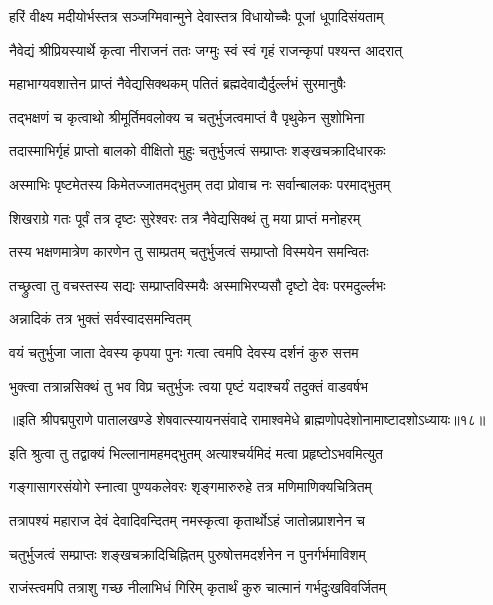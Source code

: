 \twolineshloka
{हरिं वीक्ष्य मदीयोर्भस्तत्र सञ्जग्मिवान्मुने}
{देवास्तत्र विधायोच्चैः पूजां धूपादिसंयताम्}%

\twolineshloka
{नैवेद्यं श्रीप्रियस्यार्थे कृत्वा नीराजनं ततः}
{जग्मुः स्वं स्वं गृहं राजन्कृपां पश्यन्त आदरात्}%

\twolineshloka
{महाभाग्यवशात्तेन प्राप्तं नैवेद्यसिक्थकम्}
{पतितं ब्रह्मदेवाद्यैर्दुर्ल्लभं सुरमानुषैः}%

\twolineshloka
{तद्भक्षणं च कृत्वाथो श्रीमूर्तिमवलोक्य च}
{चतुर्भुजत्वमाप्तं वै पृथुकेन सुशोभिना}%

\twolineshloka
{तदास्माभिर्गृहं प्राप्तो बालको वीक्षितो मुहुः}
{चतुर्भुजत्वं सम्प्राप्तः शङ्खचक्रादिधारकः}%

\twolineshloka
{अस्माभिः पृष्टमेतस्य किमेतज्जातमद्भुतम्}
{तदा प्रोवाच नः सर्वान्बालकः परमाद्भुतम्}%

\twolineshloka
{शिखराग्रे गतः पूर्वं तत्र दृष्टः सुरेश्वरः}
{तत्र नैवेद्यसिक्थं तु मया प्राप्तं मनोहरम्}%

\twolineshloka
{तस्य भक्षणमात्रेण कारणेन तु साम्प्रतम्}
{चतुर्भुजत्वं सम्प्राप्तो विस्मयेन समन्वितः}%

\twolineshloka
{तच्छ्रुत्वा तु वचस्तस्य सद्यः सम्प्राप्तविस्मयैः}
{अस्माभिरप्यसौ दृष्टो देवः परमदुर्ल्लभः}%

अन्नादिकं तत्र भुक्तं सर्वस्वादसमन्वितम्

\twolineshloka
{वयं चतुर्भुजा जाता देवस्य कृपया पुनः}
{गत्वा त्वमपि देवस्य दर्शनं कुरु सत्तम}%

\twolineshloka
{भुक्त्वा तत्रान्नसिक्थं तु भव विप्र चतुर्भुजः}
{त्वया पृष्टं यदाश्चर्यं तदुक्तं वाडवर्षभ}%

॥इति श्रीपद्मपुराणे पातालखण्डे शेषवात्स्यायनसंवादे रामाश्वमेधे ब्राह्मणोपदेशोनामाष्टादशोऽध्यायः॥१८॥



\twolineshloka
{इति श्रुत्वा तु तद्वाक्यं भिल्लानामहमद्भुतम्}
{अत्याश्चर्यमिदं मत्वा प्रहृष्टोऽभवमित्युत}%

\twolineshloka
{गङ्गासागरसंयोगे स्नात्वा पुण्यकलेवरः}
{शृङ्गमारुरुहे तत्र मणिमाणिक्यचित्रितम्}%

\twolineshloka
{तत्रापश्यं महाराज देवं देवादिवन्दितम्}
{नमस्कृत्वा कृतार्थोऽहं जातोन्नप्राशनेन च}%

\twolineshloka
{चतुर्भुजत्वं सम्प्राप्तः शङ्खचक्रादिचिह्नितम्}
{पुरुषोत्तमदर्शनेन न पुनर्गर्भमाविशम्}%

\twolineshloka
{राजंस्त्वमपि तत्राशु गच्छ नीलाभिधं गिरिम्}
{कृतार्थं कुरु चात्मानं गर्भदुःखविवर्जितम्}%

